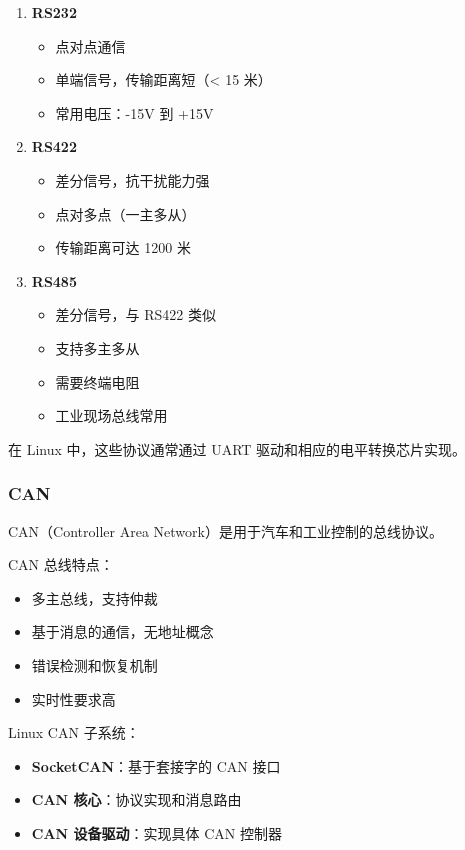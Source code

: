 \begin{enumerate}
  \item \textbf{RS232}
    \begin{itemize}
      \item 点对点通信
      \item 单端信号，传输距离短（< 15 米）
      \item 常用电压：-15V 到 +15V
    \end{itemize}

  \item \textbf{RS422}
    \begin{itemize}
      \item 差分信号，抗干扰能力强
      \item 点对多点（一主多从）
      \item 传输距离可达 1200 米
    \end{itemize}

  \item \textbf{RS485}
    \begin{itemize}
      \item 差分信号，与 RS422 类似
      \item 支持多主多从
      \item 需要终端电阻
      \item 工业现场总线常用
    \end{itemize}
\end{enumerate}

在 Linux 中，这些协议通常通过 UART 驱动和相应的电平转换芯片实现。

\subsubsection{CAN}

CAN（Controller Area Network）是用于汽车和工业控制的总线协议。

CAN 总线特点：
\begin{itemize}
  \item 多主总线，支持仲裁
  \item 基于消息的通信，无地址概念
  \item 错误检测和恢复机制
  \item 实时性要求高
\end{itemize}

Linux CAN 子系统：
\begin{itemize}
  \item \textbf{SocketCAN}：基于套接字的 CAN 接口
  \item \textbf{CAN 核心}：协议实现和消息路由
  \item \textbf{CAN 设备驱动}：实现具体 CAN 控制器
\end{itemize}


